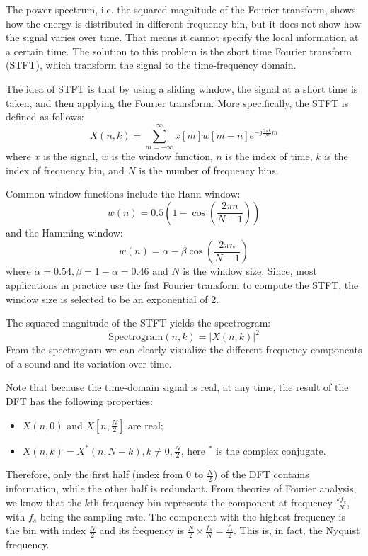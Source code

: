 \documentclass[12pt,final,twoside]{report}
\begin{document}
The power spectrum, i.e. the squared magnitude of the Fourier transform, shows how the energy is distributed in different frequency bin, but it does not show how the signal varies over time. That means it cannot specify the local information at a certain time. The solution to this problem is the short time Fourier transform (STFT), which transform the signal to the time-frequency domain.

The idea of STFT is that by using a sliding window, the signal at a short time is taken, and then applying the Fourier transform. More specifically, the STFT is defined as follows:
\begin{equation}
  X(n, k) = \sum_{m = -\infty}^{\infty} x[m]w[m-n]e^{-j \frac{2\pi k}{N} m}
\end{equation}
where $x$ is the signal, $w$ is the window function, $n$ is the index of time, $k$ is the index of frequency bin, and $N$ is the number of frequency bins. 

Common window functions include the Hann window:
\begin{equation} w(n) = 0.5 (1 - \cos(\frac{2\pi n}{N-1})) \end{equation}
and the Hamming window:
\begin{equation} w(n) = \alpha - \beta \cos(\frac{2\pi n}{N-1}) \end{equation}
where $\alpha = 0.54, \beta = 1 - \alpha = 0.46$ and $N$ is the window size.
Since, most applications in practice use the fast Fourier transform to compute the STFT, the window size is selected to be an exponential of 2.

The squared magnitude of the STFT yields the spectrogram:
\[ \text{Spectrogram}(n, k) = \left|X(n,k)\right|^2 \]
From the spectrogram we can clearly visualize the different frequency components of a sound and its variation over time.

Note that because the time-domain signal is real, at any time, the result of the DFT has the following properties:
\begin{itemize}
  \item $X(n,0)$ and $X[n, \frac{N}{2}]$ are real;
  \item $X(n,k) = X^*(n,N-k), k \neq 0, \frac{N}{2}$, here $^*$ is the complex conjugate.
\end{itemize}

Therefore, only the first half (index from $0$ to $\frac{N}{2}$) of the DFT contains information, while the other half is redundant. From theories of Fourier analysis, we know that the $k$th frequency bin represents the component at frequency $\frac{kf_s}{N}$, with $f_s$ being the sampling rate. The component with the highest frequency is the bin with index $\frac{N}{2}$ and its frequency is $\frac{N}{2} \times \frac{f_s}{N} = \frac{f_s}{2}$. This is, in fact, the Nyquist frequency.
\end{document}
